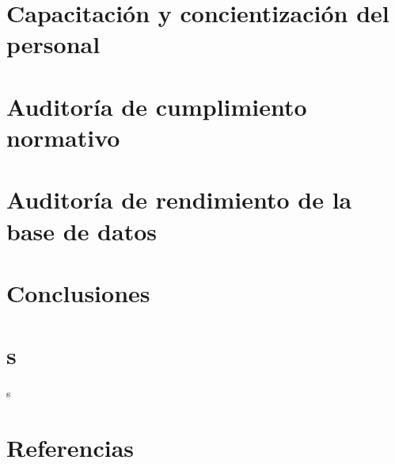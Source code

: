 \documentclass[12pt,a4paper]{article}
\begin{document}
\section{Capacitación y concientización del personal}
\section{Auditoría de cumplimiento normativo}
\section{Auditoría de rendimiento de la base de datos}
\section{Conclusiones}

\section{s}
s\cite{prueba}
\newpage
\section{Referencias}


\end{document}
